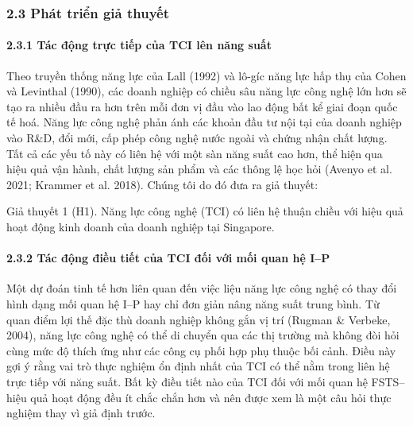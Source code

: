 \documentclass[12pt,a4paper]{article}
\begin{document}
\hypertarget{23-phuxe1t-triux1ec3n-giux1ea3-thuyux1ebft}{%
\subsubsection{2.3 Phát triển giả
thuyết}\label{23-phuxe1t-triux1ec3n-giux1ea3-thuyux1ebft}}

\hypertarget{231-tuxe1c-ux111ux1ed9ng-trux1ef1c-tiux1ebfp-cux1ee7a-tci-luxean-nux103ng-suux1ea5t}{%
\paragraph{2.3.1 Tác động trực tiếp của TCI lên năng
suất}\label{231-tuxe1c-ux111ux1ed9ng-trux1ef1c-tiux1ebfp-cux1ee7a-tci-luxean-nux103ng-suux1ea5t}}

Theo truyền thống năng lực của Lall (1992) và lô-gíc năng lực hấp thụ
của Cohen và Levinthal (1990), các doanh nghiệp có chiều sâu năng lực
công nghệ lớn hơn sẽ tạo ra nhiều đầu ra hơn trên mỗi đơn vị đầu vào lao
động bất kể giai đoạn quốc tế hoá. Năng lực công nghệ phản ánh các khoản
đầu tư nội tại của doanh nghiệp vào R\&D, đổi mới, cấp phép công nghệ
nước ngoài và chứng nhận chất lượng. Tất cả các yếu tố này có liên hệ
với một sàn năng suất cao hơn, thể hiện qua hiệu quả vận hành, chất
lượng sản phẩm và các thông lệ học hỏi (Avenyo et al. 2021; Krammer et
al. 2018). Chúng tôi do đó đưa ra giả thuyết:

Giả thuyết 1 (H1). Năng lực công nghệ (TCI) có liên hệ thuận chiều với
hiệu quả hoạt động kinh doanh của doanh nghiệp tại Singapore.

\hypertarget{232-tuxe1c-ux111ux1ed9ng-ux111iux1ec1u-tiux1ebft-cux1ee7a-tci-ux111ux1ed1i-vux1edbi-mux1ed1i-quan-hux1ec7-ip}{%
\paragraph{2.3.2 Tác động điều tiết của TCI đối với mối quan hệ
I--P}\label{232-tuxe1c-ux111ux1ed9ng-ux111iux1ec1u-tiux1ebft-cux1ee7a-tci-ux111ux1ed1i-vux1edbi-mux1ed1i-quan-hux1ec7-ip}}

Một dự đoán tinh tế hơn liên quan đến việc liệu năng lực công nghệ có
thay đổi hình dạng mối quan hệ I--P hay chỉ đơn giản nâng năng suất
trung bình. Từ quan điểm lợi thế đặc thù doanh nghiệp không gắn vị trí
(Rugman \& Verbeke, 2004), năng lực công nghệ có thể di chuyển qua các
thị trường mà không đòi hỏi cùng mức độ thích ứng như các công cụ phối
hợp phụ thuộc bối cảnh. Điều này gợi ý rằng vai trò thực nghiệm ổn định
nhất của TCI có thể nằm trong liên hệ trực tiếp với năng suất. Bất kỳ
điều tiết nào của TCI đối với mối quan hệ FSTS--hiệu quả hoạt động đều
ít chắc chắn hơn và nên được xem là một câu hỏi thực nghiệm thay vì giả
định trước.
\end{document}
